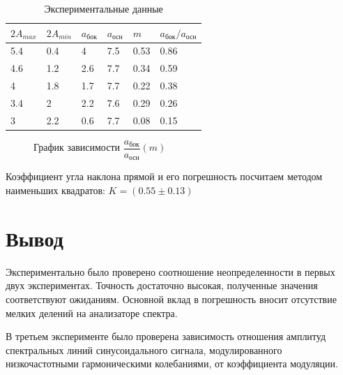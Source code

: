 \documentclass[a4paper, 12pt]{article}
\begin{document}
\begin{table}[H]
\centering
\begin{tabular}{|l|l|l|l|l|l|}
\hline
\textbf{$2A_{max}$} & \textbf{$2A_{min}$} & \textbf{$a_\text{бок}$} & \textbf{$a_\text{осн}$} & \textbf{$m$} & \textbf{$a_\text{бок}/a_\text{осн}$} \\ \hline
5.4                 & 0.4                 & 4                       & 7.5                     & 0.53         & 0.86                                 \\ \hline
4.6                 & 1.2                 & 2.6                     & 7.7                     & 0.34         & 0.59                                 \\ \hline
4                   & 1.8                 & 1.7                     & 7.7                     & 0.22         & 0.38                                 \\ \hline
3.4                 & 2                   & 2.2                     & 7.6                     & 0.29         & 0.26                                 \\ \hline
3                   & 2.2                 & 0.6                     & 7.7                     & 0.08         & 0.15                                 \\ \hline
\end{tabular}
\caption{Экспериментальные данные}
\label{my-label}
\end{table}

\begin {figure}[H]
\begin{center}
{}
\caption{График зависимости $\dfrac{a_\text{бок}}{a_\text{осн}}(m)$}
\end{center}
\end{figure}



Коэффициент угла наклона прямой и его погрешность посчитаем методом наименьших квадратов: $K = \left(0.55\pm0.13\right)$

\section{Вывод}

Экспериментально было проверено соотношение неопределенности в первых двух экспериментах. Точность достаточно высокая, полученные значения соответствуют ожиданиям. Основной вклад в погрешность вносит отсутствие мелких делений на анализаторе спектра.

В третьем эксперименте было проверена зависимость отношения амплитуд спектральных линий синусоидального сигнала, модулированного низкочастотными гармоническими колебаниями, от коэффициента модуляции.
\end{document}
